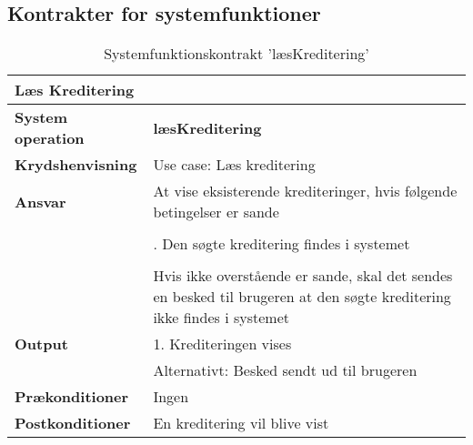 \subsection{Kontrakter for systemfunktioner}{\label{section: systemfunktionskontrakter}}


\begin{table}[H]
    \begin{tabularx}{\textwidth}{|p{4cm}|X|}
        \hline
        \multicolumn{2}{|X|}{\textbf{Læs Kreditering}}\\ 
        \hline
        \textbf{System operation}       & \textbf{læsKreditering} \\ \hline
        \textbf{Krydshenvisning}        & Use case: Læs kreditering \\ \hline
        \textbf{Ansvar}                 & At vise eksisterende krediteringer, hvis følgende betingelser er sande \\ 
                                        & \\
                                        & \quad 1. Den søgte kreditering findes i systemet\\
                                        & \\
                                        & Hvis ikke overstående er sande, skal det sendes en besked til brugeren at den søgte kreditering ikke findes i systemet\\\hline
        \textbf{Output}                 & 1. Krediteringen vises\\ 
                                        & Alternativt: Besked sendt ud til brugeren\\ \hline
        \textbf{Prækonditioner}         & Ingen \\ \hline
        \textbf{Postkonditioner}        & En kreditering vil blive vist \\ \hline
    \end{tabularx}
    \caption{Systemfunktionskontrakt 'læsKreditering'}
    \label{tab:kontrakter_læs_kreditering}
\end{table}

